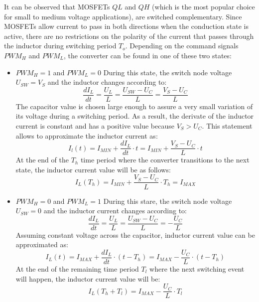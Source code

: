 It can be observed that MOSFETs $QL$ and $QH$ (which is the most popular choice for small to medium voltage applications), are switched complementary.
Since MOSFETs allow current to pass in both directions when the conduction state is active, there are no restrictions  on the polarity of the current that passes through the inductor during switching period $T_o$.
Depending on the command signals $PWM_H$ and $PWM_L$, the converter can be found in one of these two states:
\begin{itemize}
    \item $PWM_H = 1$ and $PWM_L = 0$
    During this state, the switch node voltage $U_{SW} = V_S$ and the inductor changes according to:
    \begin{equation}
        \frac{dI_L}{dt} = \frac{U_L}{L} = \frac{U_{SW} - U_C}{L} = \frac{V_S - U_C}{L}
    \end{equation}
    The capacitor value is chosen large enough to assure a very small variation of its voltage during a switching period.
    As a result, the derivate of the inductor current is constant and has a positive value because $V_S > U_C$.
    This statement allows to approximate the inductor current as:
    \begin{equation}
        I_l(t) = I_{MIN} + \frac{dI_L}{dt} \cdot t = I_{MIN} + \frac{V_S - U_C}{L} \cdot t
    \end{equation}
    At the end of the $T_h$ time period where the converter transitions to the next state, the inductor current value will be as follows:
    \begin{equation}
        I_L(T_h) = I_{MIN} + \frac{V_S - U_C}{L} \cdot T_h = I_{MAX}
    \end{equation}
    
    \item $PWM_H = 0$ and $PWM_L = 1$
    During this stare, the switch node voltage $U_{SW} = 0$ and the inductor current changes according to:
    \begin{equation}
        \frac{dI_L}{dt} = \frac{U_L}{L} = \frac{U_{SW} - U_C}{L} = -\frac{U_C}{L}
    \end{equation}
    Assuming constant voltage across the capacitor, inductor current value can be approximated as:
    \begin{equation}
        I_L(t) = I_{MAX} + \frac{dI_L}{dt} \cdot (t - T_h) = I_{MAX} - \frac{U_C}{L} \cdot (t - T_h)
    \end{equation}
    At the end of the remaining time period $T_l$ where the next switching event will happen, the inductor current value will be:
    \begin{equation}
        I_L(T_h + T_l) = I_{MAX} - \frac{U_C}{L} \cdot T_l
    \end{equation}
\end{itemize}

